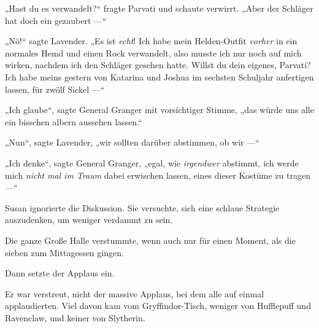 „Hast du es verwandelt?“ fragte Parvati und schaute verwirrt.
„Aber der Schläger hat doch ein  gezaubert —“

„Nö!“ sagte Lavender.
„Es ist \emph{echt}! Ich habe mein Helden-Outfit \emph{vorher} in ein normales Hemd und einen Rock verwandelt, also musste ich nur noch  auf mich wirken, nachdem ich den Schläger gesehen hatte. Willst du dein eigenes, Parvati? Ich habe meins gestern von Katarina und Joshua im sechsten Schuljahr anfertigen lassen, für zwölf Sickel —“

„Ich glaube“, sagte General Granger mit vorsichtiger Stimme, „das würde uns alle ein bisschen albern aussehen lassen.“

„Nun“, sagte Lavender, „wir sollten darüber abstimmen, ob wir —“

„Ich denke“, sagte General Granger, „egal, wie \emph{irgendwer} abstimmt, ich werde mich \emph{nicht} \emph{mal im Traum} dabei erwischen lassen, eines dieser Kostüme zu tragen —“

Susan ignorierte die Diskussion. Sie versuchte, sich eine schlaue Strategie auszudenken, um weniger verdammt zu sein.

\later

Die ganze Große Halle verstummte, wenn auch nur für einen Moment, als die sieben zum Mittagessen gingen.

Dann setzte der Applaus ein.

Er war verstreut, nicht der massive Applaus, bei dem alle auf einmal applaudierten. Viel davon kam vom Gryffindor-Tisch, weniger von Hufflepuff und Ravenclaw, und keiner von Slytherin.

